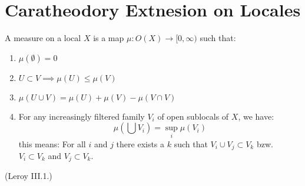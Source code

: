 \begin{comment}
\begin{lemma}[$b(X)$ generates sublocals]
    Every sublocal $X$ is an intersection of elements of $b(X)$.
    \label{lem:b_X_generates_sublocals}
    \uses{def:induced_boolean_algebra}
\end{lemma}


\begin{lemma}[Union of Intersections]
(Leroy Lemme 2.4)
    \label{lem:union_of_intersections}
    \uses{def:sublocal_intersection,prop:boolean_algebra,lem:b_X_generates_sublocals}
    For any family $B_i$ of sublocals of a local $E$ and a sublocal $A$, we have:
    \[A \cup (\bigcap_i B_i) = \bigcap_i (A \cap B_i)\]
    This implies if $A_i$ and $B_j$ are families of sublocals of $X$, we have:
    \[(\bigcap_i A_i)\cup(\bigcap_j B_j) =  \bigcap_{ij}(A_i \cup B_j)\]
\end{lemma}


\begin{theorem}[Preimage commutes with unions]
(Leroy resultat principal)
    \label{thm:preimage_commutes_with_unions}
    \uses{lem:union_of_intersections,def:inverse_images}
    For any morphism $f$ of locals, we have:
    \[f^{-1}(A \cup B) = f^{-1}(A) \cup f^{-1}(B)\]
\end{theorem}

\end{comment}
\section{Caratheodory Extnesion on Locales}\label{sec:leroy-chapter-iii}
\begin{definition}
    \label{def:measure_on_locals}
    \leanok
    A measure on a local $X$ is a map $\mu : O(X) \to [0,\infty)$ such that:
    \begin{enumerate}
        \item $\mu(\emptyset) = 0$
        \item $U \subset V \implies \mu(U) \le \mu(V)$
        \item $\mu(U \cup V) = \mu(U) + \mu(V) - \mu(V \cap V)$
        \item For any increasingly filtered family $V_i$ of open sublocals of $X$, we have:
        \[\mu(\bigcup V_i) = \sup_i \mu(V_i)\] this means:
        For all $i$ and $j$ there exists a $k$ such that $V_i \cup V_j \subset V_k$ bzw. $V_i \subset V_k$ and $V_j \subset V_k$.
    \end{enumerate}
    (Leroy III.1.)
\end{definition}

